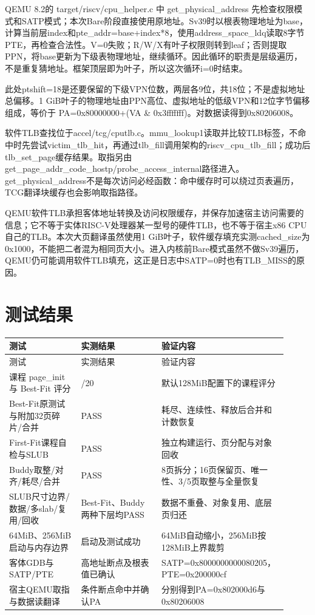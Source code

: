 \documentclass[UTF8,a4paper,10pt]{ctexart}
\begin{document}
QEMU 8.2的 target/riscv/cpu\_helper.c 中 get\_physical\_address 先检查权限模式和SATP模式；本次Bare阶段直接使用原地址。Sv39时以根表物理地址为base，计算当前层index和pte\_addr=base+index*8，使用address\_space\_ldq读取8字节PTE，再检查合法性。V=0失败；R/W/X有叶子权限则转到leaf；否则提取PPN，将base更新为下级表物理地址，继续循环。因此循环的职责是层级遍历，不是重复猜地址。框架顶层即为叶子，所以这次循环i=0时结束。


此处ptshift=18是还要保留的下级VPN位数，两层各9位，共18位；不是虚拟地址总偏移。1 GiB叶子的物理地址由PPN高位、虚拟地址的低级VPN和12位字节偏移组成，等价于 PA=0x80000000+(VA \& 0x3fffffff)。对数据读得到0x80206008。


软件TLB查找位于accel/tcg/cputlb.c。mmu\_lookup1读取并比较TLB标签，不命中时先尝试victim\_tlb\_hit，再通过tlb\_fill调用架构的riscv\_cpu\_tlb\_fill；成功后tlb\_set\_page缓存结果。取指另由get\_page\_addr\_code\_hostp/probe\_access\_internal路径进入。get\_physical\_address不是每次访问必经函数：命中缓存时可以绕过页表遍历，TCG翻译块缓存也会影响取指路径。


QEMU软件TLB承担客体地址转换及访问权限缓存，并保存加速宿主访问需要的信息；它不等于实体RISC-V处理器某一型号的硬件TLB，也不等于宿主x86 CPU自己的TLB。本次大页翻译虽然使用1 GiB叶子，软件缓存填充实测cached\_size为0x1000，不能把二者混为相同页大小。进入内核前Bare模式虽然不做Sv39遍历，QEMU仍可能调用软件TLB填充，这正是日志中SATP=0时也有TLB\_MISS的原因。


\section{测试结果}

{\small
\setlength{\tabcolsep}{3pt}
\renewcommand{\arraystretch}{1.22}
\begin{longtable}{>{\raggedright\arraybackslash}p{0.25\linewidth}>{\raggedright\arraybackslash}p{0.29\linewidth}>{\raggedright\arraybackslash}p{0.37\linewidth}}
\toprule
测试 & 实测结果 & 验证内容 \\
\midrule\endfirsthead
测试 & 实测结果 & 验证内容 \\
\midrule\endhead
课程 page\_init 与 Best-Fit 评分 & 20/20 & 默认128MiB配置下的课程评分 \\
Best-Fit原测试与附加32页碎片/合并 & PASS & 耗尽、连续性、释放后合并和计数恢复 \\
First-Fit课程自检与SLUB & PASS & 独立构建运行、页分配与对象回收 \\
Buddy取整/对齐/耗尽/合并 & PASS & 8页拆分；16页保留页、唯一性、3/5页取整与全量恢复 \\
SLUB尺寸边界/数据/多slab/复用/回收 & Best-Fit、Buddy两种下层均PASS & 数据不重叠、对象复用、底层页归还 \\
64MiB、256MiB启动与内存边界 & 启动及测试成功 & 64MiB自动缩小，256MiB按128MiB上界裁剪 \\
客体GDB与SATP/PTE & 高地址断点及根表值已确认 & SATP=0x8000000000080205，PTE=0x200000cf \\
宿主QEMU取指与数据读翻译 & 条件断点命中并确认PA & 分别得到PA=0x802000d6与0x80206008 \\
\bottomrule
\end{longtable}
}
\end{document}
